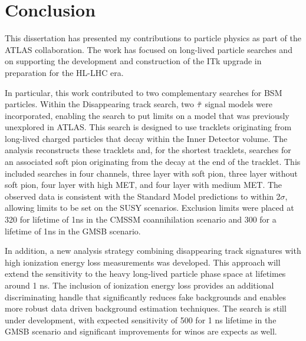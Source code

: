 \chapter{Conclusion}


This dissertation has presented my contributions to particle physics as part of the ATLAS collaboration. The work has focused on long-lived particle searches and on supporting the development and construction of the ITk upgrade in preparation for the HL-LHC era.



In particular, this work contributed to two complementary searches for BSM particles. Within the Disappearing track search, two $\tilde{\tau}$ signal models were incorporated, enabling the search to put limits on a model that was previously unexplored in ATLAS. 
This search is designed to use tracklets originating from long-lived charged particles that decay within the Inner Detector volume. The analysis reconstructs these tracklets and, for the shortest tracklets, searches for an associated soft pion originating from the decay at the end of the tracklet. 
This included searches in four channels, three layer with soft pion, three layer without soft pion, four layer with high MET, and four layer with medium MET. The  observed data is consistent with the Standard Model predictions to within 2$\sigma$, allowing limits to be set on the SUSY scenarios. Exclusion limits were placed at 320 \GeV for lifetime of 1ns in the CMSSM \stau coannihilation scenario and 300 \GeV for a lifetime of 1ns in the GMSB \stau scenario. 


In addition, a new analysis strategy combining disappearing track signatures with high ionization energy loss measurements was developed. This approach will extend the sensitivity to the heavy long-lived particle phase space at lifetimes around 1 ns. The inclusion of ionization energy loss provides an additional discriminating handle that significantly reduces fake backgrounds and enables more robust data driven background estimation techniques. The search is still under development, with expected sensitivity of 500 \GeV for 1 ns lifetime in the GMSB \stau scenario and significant improvements for winos are expects as well. 




